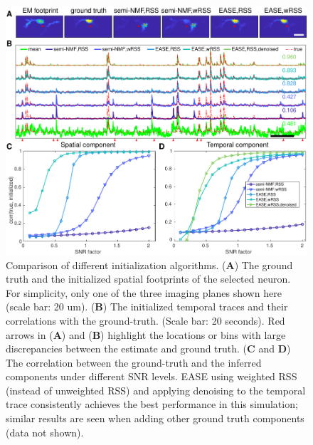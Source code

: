 \documentclass[10pt,letterpaper]{article}
\begin{document}
{\begin{figure}[t!]
	\centering
	\includegraphics[width=1\textwidth]{Figs/fig_initialization.pdf}
	\caption{Comparison of different initialization algorithms.  (\textbf{A}) The ground truth and the initialized spatial footprints of the selected neuron. For simplicity, only one of the three imaging planes shown here (scale bar: 20 um). (\textbf{B}) The initialized temporal traces and their correlations with the ground-truth. %
	(Scale bar: 20 seconds).  Red arrows in (\textbf{A}) and (\textbf{B}) highlight the locations or bins with large discrepancies between the estimate and ground truth. (\textbf{C} and \textbf{D}) The correlation between the ground-truth and the inferred components under different SNR levels. EASE using weighted RSS (instead of unweighted RSS) and applying denoising to the temporal trace consistently achieves the best performance in this simulation; similar results are seen when adding other ground truth components (data not shown).}
\label{fig:init_ac}
\end{figure}

}
\end{document}
